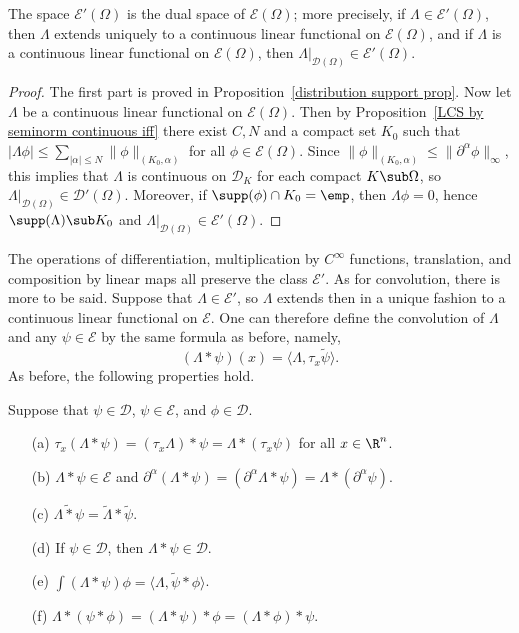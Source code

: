 \begin{theorem}\label{compact supported distribution dual of C^infty}
The space $\mathscr{E}'(\Omega)$ is the dual space of $\mathscr{E}(\Omega)$; more precisely, if $\Lambda\in\mathscr{E}'(\Omega)$, then $\Lambda$ extends uniquely to a continuous linear functional on $\mathscr{E}(\Omega)$, and if $\Lambda$ is a continuous linear functional on $\mathscr{E}(\Omega)$, then $\Lambda|_{\mathscr{D}(\Omega)}\in\mathscr{E}'(\Omega)$.
\end{theorem}
\begin{proof}
The first part is proved in Proposition~\ref{distribution support prop}. Now let $\Lambda$ be a continuous linear functional on $\mathscr{E}(\Omega)$. Then by Proposition~\ref{LCS by seminorm continuous iff} there exist $C,N$ and a compact set $K_0$ such that $|\Lambda\phi|\leq\sum_{|\alpha|\leq N}\|\phi\|_{(K_0,\alpha)}$ for all $\phi\in \mathscr{E}(\Omega)$. Since $\|\phi\|_{(K_0,\alpha)}\leq\|\partial^\alpha\phi\|_\infty$, this implies that $\Lambda$ is continuous on $\mathscr{D}_K$ for each compact $K\sub\Omega$, so $\Lambda|_{\mathscr{D}(\Omega)}\in\mathscr{D}'(\Omega)$. Moreover, if $\supp(\phi)\cap K_0=\emp$, then $\Lambda\phi=0$, hence $\supp(\Lambda)\sub K_0$ and $\Lambda|_{\mathscr{D}(\Omega)}\in\mathscr{E}'(\Omega)$.
\end{proof}
The operations of differentiation, multiplication by $C^\infty$ functions, translation, and composition by linear maps all preserve the class $\mathscr{E}'$. As for convolution, there is more to be said. Suppose that $\Lambda\in\mathscr{E}'$, so $\Lambda$ extends then in a unique fashion to a continuous linear functional on $\mathscr{E}$. One can therefore define the convolution of $\Lambda$ and any $\psi\in \mathscr{E}$ by the same formula as before, namely,
\[(\Lambda\ast\psi)(x)=\langle\Lambda,\tau_x\tilde{\psi}\rangle.\]
As before, the following properties hold.
\begin{proposition}\label{convolution compact distribution and function prop}
Suppose that $\psi\in\mathscr{D}$, $\psi\in \mathscr{E}$, and $\phi\in\mathscr{D}$.
\begin{itemize}
\item[(a)] $\tau_x(\Lambda\ast\psi)=(\tau_x\Lambda)\ast\psi=\Lambda\ast(\tau_x\psi)$ for all $x\in\R^n$. 
\item[(b)] $\Lambda\ast\psi\in \mathscr{E}$ and $\partial^\alpha(\Lambda\ast\psi)=(\partial^\alpha\Lambda\ast\psi)=\Lambda\ast(\partial^\alpha\psi)$.
\item[(c)] $\widetilde{\Lambda\ast\psi}=\widetilde{\Lambda}\ast\tilde{\psi}$.
\item[(d)] If $\psi\in\mathscr{D}$, then $\Lambda\ast\psi\in\mathscr{D}$.
\item[(e)] $\int(\Lambda\ast\psi)\phi=\langle\Lambda,\tilde{\psi}\ast\phi\rangle$.
\item[(f)] $\Lambda\ast(\psi\ast\phi)=(\Lambda\ast\psi)\ast\phi=(\Lambda\ast\phi)\ast\psi$. 
\end{itemize}
\end{proposition}
